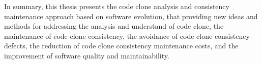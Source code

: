 {In summary, this thesis presents the code clone analysis and consistency maintenance approach based on software evolution, that providing new ideas and methods for addressing the analysis and understand of code clone, the maintenance of code clone consistency, the avoidance of code clone consistency-defects, the reduction of code clone consistency maintenance costs, and the improvement of software quality and maintainability.
}


\makecover
\clearpage 
